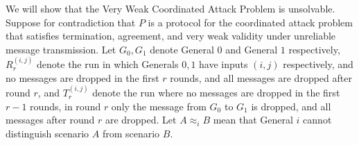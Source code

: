 \documentclass[12pt]{article}
\begin{document}
\begin{solution}
    \bbni

    We will show that the Very Weak Coordinated Attack Problem is unsolvable. Suppose for contradiction that $P$ is a protocol for the coordinated attack problem that satisfies termination, agreement, and very weak validity under unreliable message transmission.
    Let $G_0, G_1$ denote General $0$ and General $1$ respectively, $R_r^{(i, j)}$ denote the run in which Generals $0, 1$ have inputs $(i,j)$ respectively, and no messages are dropped in the first $r$ rounds, and all messages are dropped after round $r$, and $T_r^{(i,j)}$ denote the run where no messages are dropped in the first $r-1$ rounds, in round $r$ only the message from $G_0$ to $G_1$ is dropped, and all messages after round $r$ are dropped. Let $A \approx_i B$ mean that General $i$ cannot distinguish scenario $A$ from scenario $B$. 
    

\end{solution}
\end{document}
